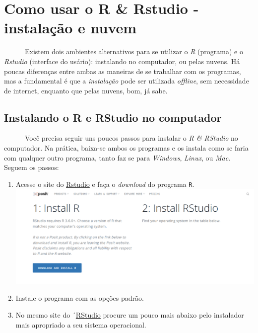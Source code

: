 \documentclass[
  letterpaper,
  DIV=11,
  numbers=noendperiod]{scrreprt}
\begin{document}

\chapter{Como usar o R \& Rstudio - instalação e
nuvem}\label{como-usar-o-r-rstudio---instalauxe7uxe3o-e-nuvem}

~~~~~~Existem dois ambientes alternativos para se utilizar o \emph{R}
(programa) e o \emph{Rstudio} (interface do usário): instalando no
computador, ou pelas nuvens. Há poucas diferenças entre ambas as
maneiras de se trabalhar com os programas, mas a fundamental é que a
\emph{instalação} pode ser utilizada \emph{offline}, sem necessidade de
internet, enquanto que pelas nuvens, bom, já sabe.

\section{Instalando o R e RStudio no
computador}\label{instalando-o-r-e-rstudio-no-computador}

~~~~~~Você precisa seguir uns poucos passos para instalar o \emph{R \&
RStudio} no computador. Na prática, baixa-se ambos os programas e os
instala como se faria com qualquer outro programa, tanto faz se para
\emph{Windows}, \emph{Linux}, ou \emph{Mac}. Seguem os passos:

\begin{enumerate}
\def\labelenumi{\arabic{enumi}.}
\item
  Acesse o site do
  \href{https://posit.co/download/rstudio-desktop/}{Rstudio} e faça o
  \emph{download} do programa \texttt{R}.
  \includegraphics{rstudioSite.png}
\item
  Instale o programa com as opções padrão.
\item
  No mesmo site do
  ´\href{https://posit.co/download/rstudio-desktop/}{RStudio} procure um
  pouco mais abaixo pelo instalador mais apropriado a seu sistema
  operacional.
\end{enumerate}
\end{document}
